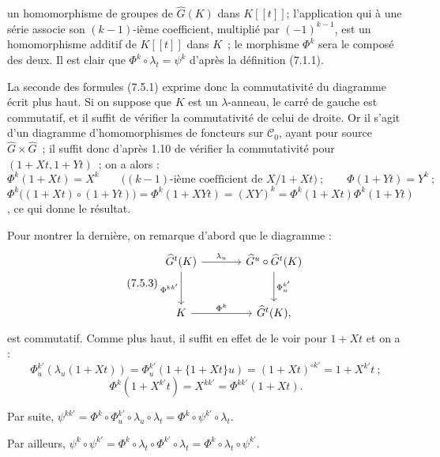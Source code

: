 
un homomorphisme de groupes de \(\widehat G(K)\) dans \(K[[t]]\); l'application qui à une série associe son \((k-1)\)-ième coefficient, multiplié par \((-1)^{k-1}\), est un homomorphisme additif de \(K[[t]]\) dans \(K\)~; le morphisme \(\Phi^k\) sera le composé des deux. Il est clair que \(\Phi^k\circ\lambda_t=\psi^k\) d'après la définition (7.1.1).

La seconde des formules (7.5.1) exprime donc la commutativité du diagramme écrit plus haut. Si on suppose que \(K\) est un \(\lambda\)-anneau, le carré de gauche est commutatif, et il suffit de vérifier la commutativité de celui de droite. Or il s'agit d'un diagramme d'homomorphismes de foncteurs sur \(\mathcal C_0\), ayant pour source \(\widehat G\times\widehat G\)~; il suffit donc d'après 1.10 de vérifier la commutativité pour \((1+Xt,1+Yt)\)~; on a alors :
\[
  \Phi^k(1+Xt)=X^k\qquad\bigl(\text{$(k-1)$-ième coefficient de }X/1+Xt\bigr)~;\qquad
  \Phi(1+Yt)=Y^k~;
\]
\(\Phi^k\bigl((1+Xt)\circ(1+Yt)\bigr)=\Phi^k(1+XYt)=(XY)^k=\Phi^k(1+Xt)\Phi^k(1+Yt)\), ce qui donne le résultat.

Pour montrer la dernière, on remarque d'abord que le diagramme :
\begin{equation}\tag{7.5.3}
\begin{tikzcd}[column sep=large,row sep=large]
\widehat G^t(K) \arrow[r,"\lambda_u"] \arrow[d,"\Phi^{kk'}"'] &
\widehat G^u\circ\widehat G^t(K) \arrow[d,"\Phi^{k'}_u"]\\
K \arrow[r,"\Phi^k"] &
\widehat G^t(K),
\end{tikzcd}
\end{equation}
est commutatif. Comme plus haut, il suffit en effet de le voir pour \(1+Xt\) et on a :
\[
  \Phi^{k'}_u(\lambda_u(1+Xt))
  =
  \Phi^{k'}_u(1+\{1+Xt\}u)
  =
  (1+Xt)^{\circ k'}
  =
  1+X^{k'}t~;
\]
\[
  \Phi^k(1+X^{k'}t)=X^{kk'}=\Phi^{kk'}(1+Xt).
\]

Par suite, \(\psi^{kk'}=\Phi^k\circ\Phi^{k'}_u\circ\lambda_u\circ\lambda_t=\Phi^k\circ\psi^{k'}\circ\lambda_t\).

Par ailleurs, \(\psi^k\circ\psi^{k'}=\Phi^k\circ\lambda_t\circ\Phi^{k'}\circ\lambda_t=\Phi^k\circ\lambda_t\circ\psi^{k'}\).
